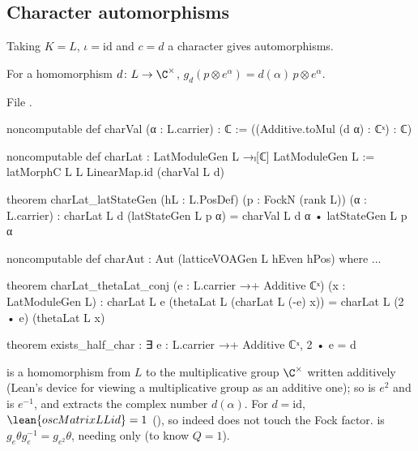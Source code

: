 \subsection{Character automorphisms}

Taking $K=L$, $\iota=\mathrm{id}$ and $c=d$ a character gives automorphisms.

\begin{definition}\label{ch03:def:charAut}
For a homomorphism $d\colon L\to\C^\times$, $g_d(p\otimes e^\alpha)=d(\alpha)\,p\otimes e^\alpha$.
\end{definition}
\noindent File .
\begin{leancode}
noncomputable def charVal (α : L.carrier) : ℂ := ((Additive.toMul (d α) : ℂˣ) : ℂ)

noncomputable def charLat : LatModuleGen L →ₗ[ℂ] LatModuleGen L :=
  latMorphC L L LinearMap.id (charVal L d)

theorem charLat_latStateGen (hL : L.PosDef) (p : FockN (rank L)) (α : L.carrier) :
    charLat L d (latStateGen L p α) = charVal L d α • latStateGen L p α

noncomputable def charAut : Aut (latticeVOAGen L hEven hPos) where ...

theorem charLat_thetaLat_conj (e : L.carrier →+ Additive ℂˣ) (x : LatModuleGen L) :
    charLat L e (thetaLat L (charLat L (-e) x)) = charLat L (2 • e) (thetaLat L x)

theorem exists_half_char : ∃ e : L.carrier →+ Additive ℂˣ, 2 • e = d
\end{leancode}
\begin{dictionary}
 is a homomorphism from $L$ to the multiplicative group $\C^\times$
written additively (Lean's device for viewing a multiplicative group as an additive one); so
 is $e^2$ and  is $e^{-1}$, and  extracts the complex number
$d(\alpha)$. For $d=\mathrm{id}$, $\lean{oscMatrix L L id}=1$ (), so
 indeed does not touch the Fock factor.  is
$g_e\theta g_e^{-1}=g_{e^2}\theta$, needing only  (to know $Q=1$).
\end{dictionary}

